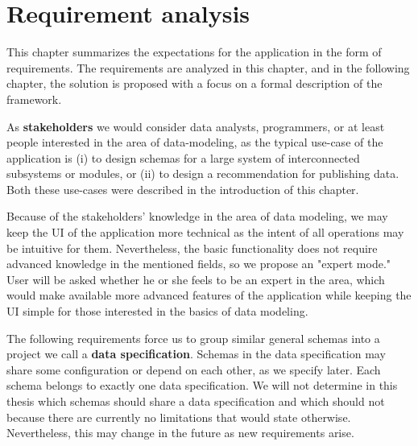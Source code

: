 \chapter{Requirement analysis}\label{chapters:analysis}

This chapter summarizes the expectations for the application in the form of requirements. The requirements are analyzed in this chapter, and in the following chapter, the solution is proposed with a focus on a formal description of the framework.

\bigskip

As \textbf{stakeholders} we would consider data analysts, programmers, or at least people interested in the area of data-modeling, as the typical use-case of the application is (i) to design schemas for a large system of interconnected subsystems or modules, or (ii) to design a recommendation for publishing data. Both these use-cases were described in the introduction of this chapter.

Because of the stakeholders' knowledge in the area of data modeling, we may keep the UI of the application more technical as the intent of all operations may be intuitive for them. Nevertheless, the basic functionality does not require advanced knowledge in the mentioned fields, so we propose an "expert mode." User will be asked whether he or she feels to be an expert in the area, which would make available more advanced features of the application while keeping the UI simple for those interested in the basics of data modeling.

\bigskip









\bigskip

The following requirements force us to group similar general schemas into a project we call a \textbf{data specification}. Schemas in the data specification may share some configuration or depend on each other, as we specify later. Each schema belongs to exactly one data specification. We will not determine in this thesis which schemas should share a data specification and which should not because there are currently no limitations that would state otherwise. Nevertheless, this may change in the future as new requirements arise.

